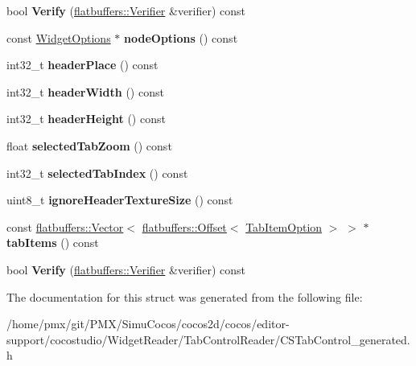 \begin{DoxyCompactItemize}
\item 
\mbox{\label{structflatbuffers_1_1TabControlOption_a0c84cf64872ef5105d4828174885af3f}} 
bool {\bfseries Verify} (\hyperlink{classflatbuffers_1_1Verifier}{flatbuffers\+::\+Verifier} \&verifier) const
\item 
\mbox{\label{structflatbuffers_1_1TabControlOption_a8ab557570f5080fb47d30bb44400a245}} 
const \hyperlink{structflatbuffers_1_1WidgetOptions}{Widget\+Options} $\ast$ {\bfseries node\+Options} () const
\item 
\mbox{\label{structflatbuffers_1_1TabControlOption_ac09a83ee1109d906561b840c46e10c16}} 
int32\+\_\+t {\bfseries header\+Place} () const
\item 
\mbox{\label{structflatbuffers_1_1TabControlOption_a573f1eb5f7698f1a0f70a0a59d3f1110}} 
int32\+\_\+t {\bfseries header\+Width} () const
\item 
\mbox{\label{structflatbuffers_1_1TabControlOption_aba886a4a383f0aec411b8d54085d00e5}} 
int32\+\_\+t {\bfseries header\+Height} () const
\item 
\mbox{\label{structflatbuffers_1_1TabControlOption_a3f13ebebd45c3cdc5b40f0d4d89b700d}} 
float {\bfseries selected\+Tab\+Zoom} () const
\item 
\mbox{\label{structflatbuffers_1_1TabControlOption_a5ad7da9da0ffc145430d39f4e2e13d83}} 
int32\+\_\+t {\bfseries selected\+Tab\+Index} () const
\item 
\mbox{\label{structflatbuffers_1_1TabControlOption_a10ae4b6e9e969b746e47a0d743810737}} 
uint8\+\_\+t {\bfseries ignore\+Header\+Texture\+Size} () const
\item 
\mbox{\label{structflatbuffers_1_1TabControlOption_a6ef05b9694a4c4c34ec095641f725084}} 
const \hyperlink{classflatbuffers_1_1Vector}{flatbuffers\+::\+Vector}$<$ \hyperlink{structflatbuffers_1_1Offset}{flatbuffers\+::\+Offset}$<$ \hyperlink{structflatbuffers_1_1TabItemOption}{Tab\+Item\+Option} $>$ $>$ $\ast$ {\bfseries tab\+Items} () const
\item 
\mbox{\label{structflatbuffers_1_1TabControlOption_a0c84cf64872ef5105d4828174885af3f}} 
bool {\bfseries Verify} (\hyperlink{classflatbuffers_1_1Verifier}{flatbuffers\+::\+Verifier} \&verifier) const
\end{DoxyCompactItemize}


The documentation for this struct was generated from the following file\+:\begin{DoxyCompactItemize}
\item 
/home/pmx/git/\+P\+M\+X/\+Simu\+Cocos/cocos2d/cocos/editor-\/support/cocostudio/\+Widget\+Reader/\+Tab\+Control\+Reader/C\+S\+Tab\+Control\+\_\+generated.\+h\end{DoxyCompactItemize}
